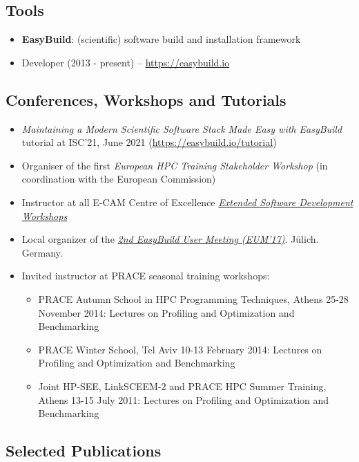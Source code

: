 \subsection*{Tools}

\begin{itemize}
\item[] \textbf{EasyBuild}: (scientific) software build and installation framework
\item[] Developer (2013 - present) -- \url{https://easybuild.io}
\end{itemize}

\subsection*{Conferences, Workshops and Tutorials}
\begin{itemize}
\item[] \emph{Maintaining a Modern Scientific Software Stack Made Easy with EasyBuild} tutorial at ISC'21, June 2021 (\url{https://easybuild.io/tutorial})
\item[] Organiser of the first \emph{European HPC Training Stakeholder Workshop} (in coordination with the European Commission)
\item[] Instructor at all E-CAM Centre of Excellence \emph{\href{https://www.e-cam2020.eu/events?tribe_paged=1&tribe_event_display=list&tribe-bar-date=2015-10-01&tribe-bar-search=Extended}{Extended Software Development Workshops}}
\item[] Local organizer of the \emph{\href{https://github.com/easybuilders/easybuild/wiki/2nd-EasyBuild-User-Meeting}{2nd EasyBuild User Meeting (EUM'17)}}. J\"ulich. Germany.
\item[]Invited instructor at PRACE seasonal training workshops:
\begin{itemize}
\item[]  PRACE Autumn School in HPC Programming Techniques, Athens 25-28 November 2014: Lectures on Profiling and Optimization and Benchmarking
\item[]  PRACE Winter School, Tel Aviv 10-13 February 2014: Lectures on Profiling and Optimization and Benchmarking
\item[] Joint HP-SEE, LinkSCEEM-2 and PRACE HPC Summer Training, Athens 13-15 July 2011: Lectures on Profiling and Optimization and Benchmarking
\end{itemize}
\end{itemize}

\subsection*{Selected Publications}

